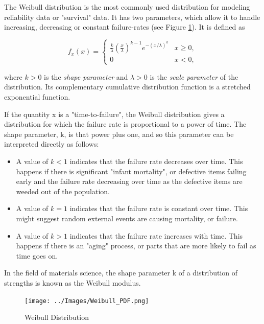 The Weibull distribution is the most commonly used distribution for modeling reliability data or "survival" data. It has two parameters, which allow it to handle increasing, decreasing or constant failure-rates (see Figure \ref{fig:weibull}).
It is defined as

\begin{equation}\label{eq_weibull}
f_x (x) =
  \begin{cases}
    \frac{k}{\lambda}\left(\frac{x}{\lambda}\right)^{k-1}e^{-(x/\lambda)^{k}} & x\geq0 ,\\
    0 & x<0 ,
    \end{cases}
\end{equation}

where $k > 0$ is the \emph{shape parameter }and $\lambda > 0$ is the \emph{scale parameter }of the distribution. Its complementary cumulative distribution function is a stretched exponential function.

If the quantity x is a "time-to-failure", the Weibull distribution gives a distribution for which the failure rate is proportional to a power of time. The shape parameter, k, is that power plus one, and so this parameter can be interpreted directly as follows:

\begin{itemize}
  \item  A value of $k < 1$ indicates that the failure rate decreases over time. This happens if there is significant "infant mortality", or defective items failing early and the failure rate decreasing over time as the defective items are weeded out of the population.

  \item  A value of $k = 1$ indicates that the failure rate is constant over time. This might suggest random external events are causing mortality, or failure.
  \item  A value of $k > 1$ indicates that the failure rate increases with time. This happens if there is an "aging" process, or parts that are more likely to fail as time goes on.
\end{itemize}

In the field of materials science, the shape parameter k of a distribution of strengths is known as the Weibull modulus.

\begin{figure}
  \centering
  \texttt{[image: ../Images/Weibull\_PDF.png]}\\
  \caption{Weibull Distribution}\label{fig:weibull}
\end{figure}


